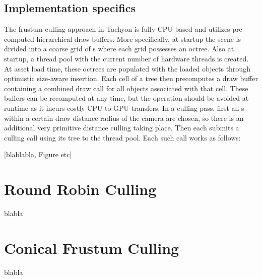 \subsection{Implementation specifics}
The frustum culling approach in Tachyon is fully CPU-based and utilizes pre-computed hierarchical draw buffers. More specifically, at startup the scene is divided into a coarse grid of s where each grid possesses an octree. Also at startup, a thread pool with the current number of hardware threads is created. At asset load time, these octrees are populated with the loaded objects through optimistic size-aware insertion. Each cell of a tree then precomputes a draw buffer containing a combined draw call for all objects associated with that cell. These buffers can be recomputed at any time, but the operation should be avoided at runtime as it incurs costly CPU to GPU transfers. 
In a culling pass, first all s within a certain draw distance radius of the camera are chosen, so there is an additional very primitive distance culling taking place. Then each  submits a culling call using its tree to the thread pool. Each such call works as follows: 

[blablabla, Figure etc]


\section{Round Robin Culling}
blabla

\section{Conical Frustum Culling}
blabla